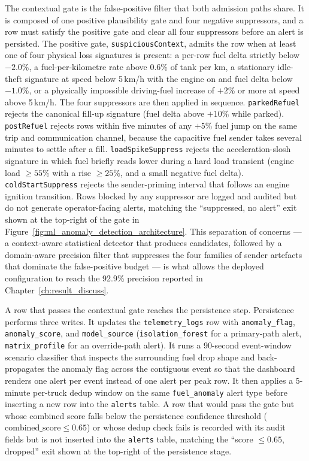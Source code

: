 The contextual gate is the false-positive filter that both admission paths share. It is composed of one positive plausibility gate and four negative suppressors, and a row must satisfy the positive gate and clear all four suppressors before an alert is persisted. The positive gate, \texttt{suspiciousContext}, admits the row when at least one of four physical loss signatures is present: a per-row fuel delta strictly below $-2.0$\%, a fuel-per-kilometre rate above $0.6$\% of tank per km, a stationary idle-theft signature at speed below 5\,km/h with the engine on and fuel delta below $-1.0$\%, or a physically impossible driving-fuel increase of $+2$\% or more at speed above 5\,km/h. The four suppressors are then applied in sequence. \texttt{parkedRefuel} rejects the canonical fill-up signature (fuel delta above $+10$\% while parked). \texttt{postRefuel} rejects rows within five minutes of any $+5$\% fuel jump on the same trip and communication channel, because the capacitive fuel sender takes several minutes to settle after a fill. \texttt{loadSpikeSuppress} rejects the acceleration-slosh signature in which fuel briefly reads lower during a hard load transient (engine load $\geq 55$\% with a rise $\geq 25$\%, and a small negative fuel delta). \texttt{coldStartSuppress} rejects the sender-priming interval that follows an engine ignition transition. Rows blocked by any suppressor are logged and audited but do not generate operator-facing alerts, matching the ``suppressed, no alert'' exit shown at the top-right of the gate in Figure~\ref{fig:ml_anomaly_detection_architecture}. This separation of concerns --- a context-aware statistical detector that produces candidates, followed by a domain-aware precision filter that suppresses the four families of sender artefacts that dominate the false-positive budget --- is what allows the deployed configuration to reach the 92.9\% precision reported in Chapter~\ref{ch:result_discuss}.

A row that passes the contextual gate reaches the persistence step. Persistence performs three writes. It updates the \texttt{telemetry\_logs} row with \texttt{anomaly\_flag}, \texttt{anomaly\_score}, and \texttt{model\_source} (\texttt{isolation\_forest} for a primary-path alert, \texttt{matrix\_profile} for an override-path alert). It runs a 90-second event-window scenario classifier that inspects the surrounding fuel drop shape and back-propagates the anomaly flag across the contiguous event so that the dashboard renders one alert per event instead of one alert per peak row. It then applies a 5-minute per-truck dedup window on the same \texttt{fuel\_anomaly} alert type before inserting a new row into the \texttt{alerts} table. A row that would pass the gate but whose combined score falls below the persistence confidence threshold ($\text{combined\_score} \leq 0.65$) or whose dedup check fails is recorded with its audit fields but is not inserted into the \texttt{alerts} table, matching the ``score $\leq 0.65$, dropped'' exit shown at the top-right of the persistence stage.


